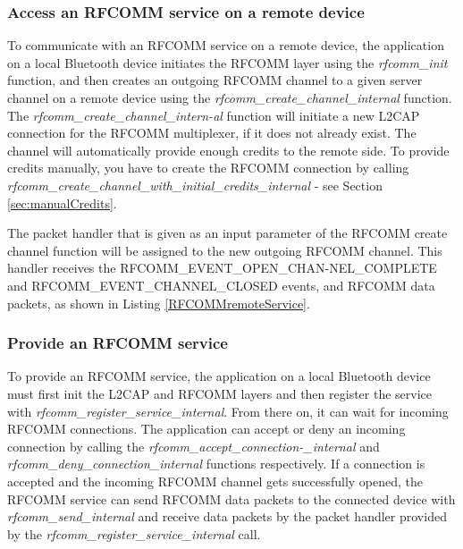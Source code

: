 
\subsubsection{Access an RFCOMM service on a remote device}
\label{subsubsection:rfcommlient}

To communicate with an RFCOMM service on a remote device, the application on a local Bluetooth device initiates the RFCOMM layer using the \emph{rfcomm\_init} function, and then creates an outgoing RFCOMM channel to a given server channel on a remote device using the \emph{rfcomm\_create\_channel\_internal} function. The  \emph{rfcomm\_create\_channel\_intern-al} function will initiate a new L2CAP connection for the RFCOMM multiplexer, if it does not already exist. The channel will automatically provide enough credits to the remote side. To provide credits manually, you have to create the RFCOMM connection by calling \emph{rfcomm\_create\_channel\_with\_initial\_credits\_internal} - see Section \ref{sec:manualCredits}.


The packet handler that is given as an input parameter of the RFCOMM create channel function will be assigned to the new outgoing \mbox{RFCOMM} channel. This handler receives the RFCOMM\_EVENT\_OPEN\_CHAN-NEL\_COMPLETE and RFCOMM\_EVENT\_CHANNEL\_CLOSED events, and RFCOMM data packets, as shown in Listing \ref{RFCOMMremoteService}.

\subsubsection{Provide an RFCOMM service}
\label{section:rfcomm_service}

To provide an RFCOMM service, the application on a local Bluetooth device must first init the L2CAP and RFCOMM layers and then register the service with \emph{rfcomm\_register\_service\_internal}. From there on, it can wait for incoming RFCOMM connections. The application can accept or deny an incoming connection by calling the \emph{rfcomm\_accept\_connection-\_internal} and \emph{rfcomm\_deny\_connection\_internal} functions respectively. If a connection is accepted and the incoming RFCOMM channel gets successfully opened, the RFCOMM service can send RFCOMM data packets to the connected device with \emph{rfcomm\_send\_internal} and receive data packets by the packet handler provided by the \emph{rfcomm\_register\_service\_internal} call.

